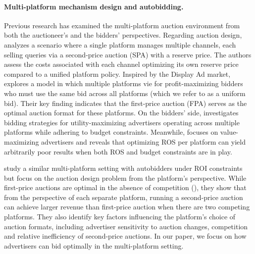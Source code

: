 \paragraph{Multi-platform mechanism design and autobidding.} Previous research has examined the multi-platform auction environment from both the auctioneer's and the bidders' perspectives. Regarding auction design, \citet{aggarwal_perlroth_zhao_ec23} analyzes a scenario where a single platform manages multiple channels, each selling queries via a second-price auction (SPA) with a reserve price. The authors assess the costs associated with each channel optimizing its own reserve price compared to a unified platform policy. Inspired by the Display Ad market, \citet{renato_balu_yifeng_www2020} explores a model in which multiple platforms vie for profit-maximizing bidders who must use the same bid across all platforms (which we refer to as a uniform bid). Their key finding indicates that the first-price auction (FPA) serves as the optimal auction format for these platforms. On the bidders' side, \citet{susan2023multi} investigates bidding strategies for utility-maximizing advertisers operating across multiple platforms while adhering to budget constraints. Meanwhile, \citet{deng2023multi} focuses on value-maximizing advertisers and reveals that optimizing ROS per platform can yield arbitrarily poor results when both ROS and budget constraints are in play. 

\citet{APSZ24} study a similar multi-platform setting with autobidders under ROI constraints but focus on the auction design problem from the platform's perspective. While first-price auctions are optimal in the absence of competition (\citet{deng2021towards}), they show that from the perspective of each separate platform, running a second-price auction can achieve larger revenue than first-price auction when there are two competing platforms. They also identify key factors influencing the platform’s choice of auction formats, including advertiser sensitivity to auction changes, competition and relative inefficiency of second-price auctions. In our paper, we focus on how advertisers can bid optimally in the multi-platform setting.


